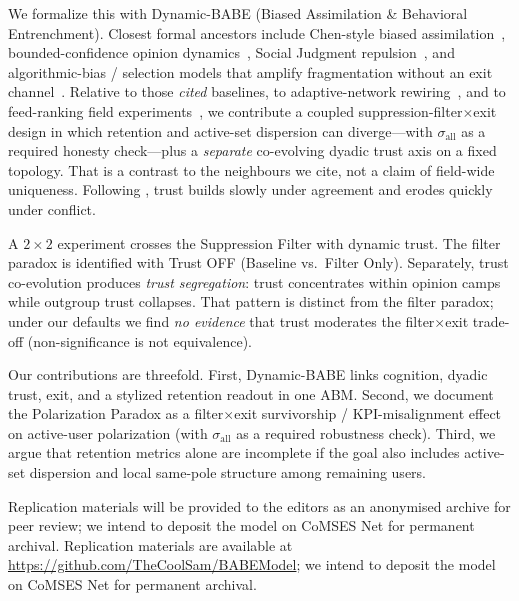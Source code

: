 We formalize this with Dynamic-BABE (Biased Assimilation \& Behavioral Entrenchment). Closest formal ancestors include Chen-style biased assimilation~\citep{Chen2021}, bounded-confidence opinion dynamics~\citep{Hegselmann2002, Deffuant2000}, Social Judgment repulsion~\citep{Sherif1961, Jager2005}, and algorithmic-bias / selection models that amplify fragmentation without an exit channel~\citep{Sirbu2019}. Relative to those \emph{cited} baselines, to adaptive-network rewiring~\citep{Macy2002, Keijzer2018}, and to feed-ranking field experiments~\citep{Guess2023, Levy2021}, we contribute a coupled suppression-filter$\times$exit design in which retention and active-set dispersion can diverge---with $\sigma_{\mathrm{all}}$ as a required honesty check---plus a \emph{separate} co-evolving dyadic trust axis on a fixed topology. That is a contrast to the neighbours we cite, not a claim of field-wide uniqueness. Following \citet{Slovic1993}, trust builds slowly under agreement and erodes quickly under conflict.

A $2\times2$ experiment crosses the Suppression Filter with dynamic trust. The filter paradox is identified with Trust OFF (Baseline vs.\ Filter Only). Separately, trust co-evolution produces \textit{trust segregation}: trust concentrates within opinion camps while outgroup trust collapses. That pattern is distinct from the filter paradox; under our defaults we find \emph{no evidence} that trust moderates the filter$\times$exit trade-off (non-significance is not equivalence).

Our contributions are threefold. First, Dynamic-BABE links cognition, dyadic trust, exit, and a stylized retention readout in one ABM. Second, we document the Polarization Paradox as a filter$\times$exit survivorship / KPI-misalignment effect on active-user polarization (with $\sigma_{\mathrm{all}}$ as a required robustness check). Third, we argue that retention metrics alone are incomplete if the goal also includes active-set dispersion and local same-pole structure among remaining users.

\ifdefined\BlindSubmission
Replication materials will be provided to the editors as an anonymised archive for peer review; we intend to deposit the model on CoMSES Net for permanent archival.
\else
Replication materials are available at \url{https://github.com/TheCoolSam/BABEModel}; we intend to deposit the model on CoMSES Net for permanent archival.
\fi
